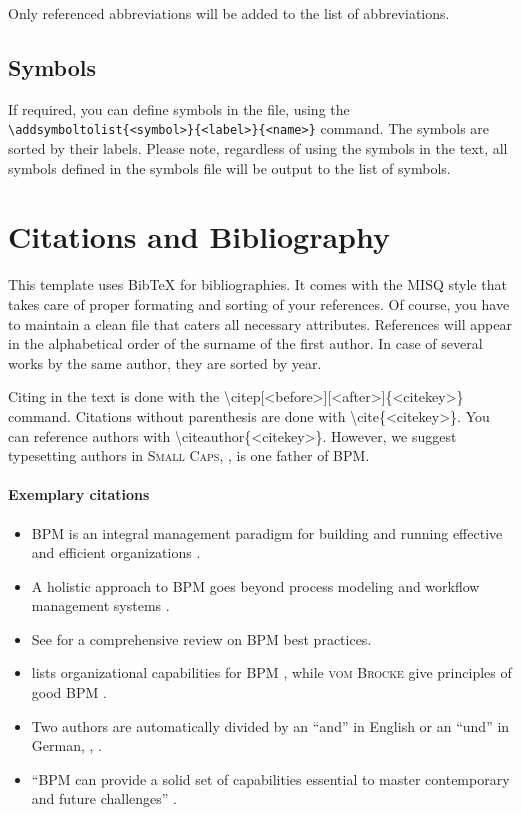 Only referenced abbreviations will be added to the list of abbreviations.

\subsection{Symbols}
If required, you can define symbols in the  file, using the \\ \texttt{\textbackslash addsymboltolist\{<symbol>\}\{<label>\}\{<name>\}} command. The symbols are sorted by their labels. Please note, regardless of using the symbols in the text, all symbols defined in the symbols file will be output to the list of symbols.

\section{Citations and Bibliography}
This template uses {BibTeX} for bibliographies. It comes with the MISQ style that takes care of proper formating and sorting of your references. Of course, you have to maintain a clean  file that caters all necessary attributes. References will appear in the alphabetical order of the surname of the first author. In case of several works by the same author, they are sorted by year.

Citing in the text is done with the \textbackslash citep[<before>][<after>]\{<citekey>\} command. Citations without parenthesis are done with \textbackslash cite\{<citekey>\}. You can reference authors with \textbackslash citeauthor\{<citekey>\}. However, we suggest typesetting authors in \textsc{Small Caps}, \eg, \textsc{\citeauthor{Hammer2015}} is one father of \ac{BPM}.

\paragraph{Exemplary citations}

\begin{itemize}
	\item \gls{BPM} is an integral management paradigm for building and running effective and efficient organizations  \citep{Hammer2015, VomBrocke2014a}.
	\item A holistic approach to \ac{BPM} goes beyond process modeling and workflow management systems \citep[]{VomBrocke2014a}.
	\item See \cite{VomBrocke2014a} for a comprehensive review on \ac{BPM} best practices.
	\item \textsc{\citeauthor{Hammer2015}} lists organizational capabilities for \ac{BPM} \citep[\cf][]{Hammer2015}, while \textsc{vom Brocke} \etal give principles of good \ac{BPM} \citep[\cf][]{VomBrocke2014a}.
	\item Two authors are automatically divided by an \enquote{and} in English or an \enquote{und} in German, \eg, \citep{Becker2011}.
	\item \enquote{\ac{BPM} can provide a solid set of capabilities essential to master contemporary and future challenges} \citep[]{VomBrocke2014a}.
\end{itemize}

